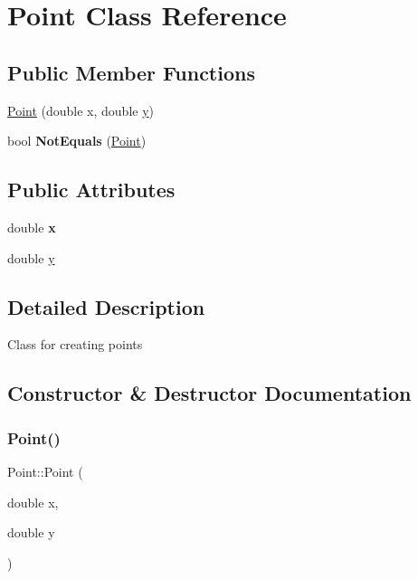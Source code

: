 \hypertarget{classPoint}{}\section{Point Class Reference}
\label{classPoint}
\subsection*{Public Member Functions}
\begin{DoxyCompactItemize}
\item 
\hyperlink{classPoint_a78b55e8d5466bb8c2cf60fa55f2562ff}{Point} (double x, double \hyperlink{classPoint_afa38be143ae800e6ad69ce8ed4df62d8}{y})
\item 
\mbox{\label{classPoint_ae29b27909788991feb92e32c0693db0b}} 
bool {\bfseries Not\+Equals} (\hyperlink{classPoint}{Point})
\end{DoxyCompactItemize}
\subsection*{Public Attributes}
\begin{DoxyCompactItemize}
\item 
\mbox{\label{classPoint_ab99c56589bc8ad5fa5071387110a5bc7}} 
double {\bfseries x}
\item 
double \hyperlink{classPoint_afa38be143ae800e6ad69ce8ed4df62d8}{y}
\end{DoxyCompactItemize}


\subsection{Detailed Description}
Class for creating points 

\subsection{Constructor \& Destructor Documentation}
\mbox{\label{classPoint_a78b55e8d5466bb8c2cf60fa55f2562ff}} 
\subsubsection{\texorpdfstring{Point()}{Point()}}
{\footnotesize\ttfamily Point\+::\+Point (\begin{DoxyParamCaption}\item[{double}]{x,  }\item[{double}]{y }\end{DoxyParamCaption})}

